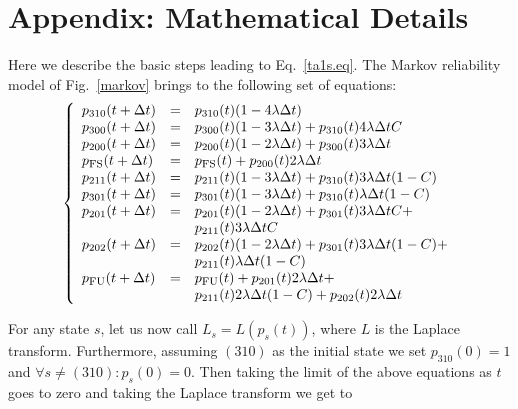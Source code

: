 \documentclass[11pt]{article}
\begin{document}
\section{Appendix: Mathematical Details}\label{a}
Here we describe the basic steps leading to Eq.~\ref{ta1s.eq}.
The Markov reliability model of Fig.~\ref{markov} brings to the following set of equations:
\begin{equation}
	\left\{
	 \begin{array}{lll}
	  p_{310}(t+\Delta t) &=& p_{310}(t) (1 - 4\lambda\Delta t) \\
	  p_{300}(t+\Delta t) &=& p_{300}(t) (1 - 3\lambda\Delta t) +  p_{310}(t) 4\lambda\Delta t C \\
	  p_{200}(t+\Delta t) &=& p_{200}(t) (1 - 2\lambda\Delta t) +  p_{300}(t) 3\lambda\Delta t \\
	  p_{\hbox{\sc fs}}(t+\Delta t) &=& p_{\hbox{\sc fs}}(t) +  p_{200}(t) 2\lambda\Delta t \\
	  p_{211}(t+\Delta t) &=& p_{211}(t) (1 - 3\lambda\Delta t) +  p_{310}(t) 3\lambda\Delta t (1-C)\\
	  p_{301}(t+\Delta t) &=& p_{301}(t) (1 - 3\lambda\Delta t) +  p_{310}(t) \lambda\Delta t (1-C)\\
	  p_{201}(t+\Delta t) &=& p_{201}(t) (1 - 2\lambda\Delta t) +  p_{301}(t) 3\lambda\Delta t C +\\
	  		      & & p_{211}(t) 3\lambda\Delta t C \\
	  p_{202}(t+\Delta t) &=& p_{202}(t) (1 - 2\lambda\Delta t) +  p_{301}(t) 3\lambda\Delta t (1-C) +\\
	  		      & & p_{211}(t) \lambda\Delta t (1-C) \\
	  p_{\hbox{\sc fu}}(t+\Delta t) &=& p_{\hbox{\sc fu}}(t) +  p_{201}(t) 2\lambda\Delta t +\\
	  		      & & p_{211}(t) 2\lambda\Delta t (1-C) + p_{202}(t) 2\lambda\Delta t
	 \end{array}
	\right.\nonumber
\end{equation}

For any state $s$, let us now call $L_s = L(p_s(t))$, where $L$ is the Laplace transform.
Furthermore, assuming $(310)$ as the initial state we set $p_{310}(0)=1$ and
$\forall s \neq (310): p_s(0) = 0$. Then 
taking the limit of the above equations as $t$ goes to zero and taking the Laplace transform
we get to
\end{document}
